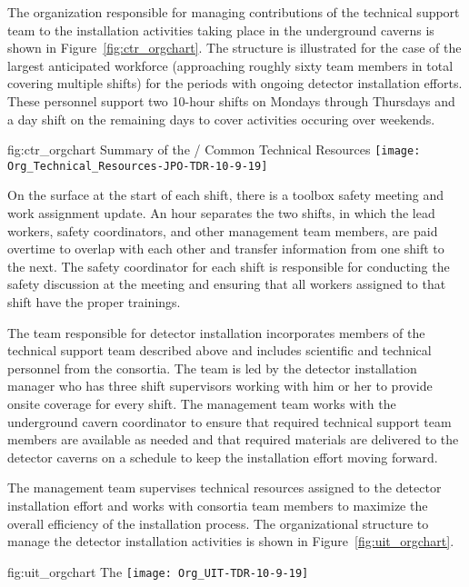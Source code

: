The organization responsible for managing contributions of 
the technical support team to the installation 
activities taking place in the underground caverns is shown 
in Figure~\ref{fig:ctr_orgchart}.  The structure is illustrated
for the case of the largest anticipated workforce (approaching 
roughly sixty team members in total covering multiple shifts) 
for the periods with ongoing detector installation efforts.
These personnel support two 10-hour shifts on Mondays through 
Thursdays and a day shift on the remaining days to cover 
activities occuring over weekends. 
\begin{dunefigure}{fig:ctr_orgchart}
  {Summary of the / Common Technical Resources}
  \texttt{[image: Org\_Technical\_Resources-JPO-TDR-10-9-19]}
\end{dunefigure}

On the surface at the start of each shift, there is a toolbox safety
meeting and work assignment update. An hour separates the two shifts,
in which the lead workers, safety coordinators, and other management
team members, are paid overtime to overlap with each other and
transfer information from one shift to the next. The safety
coordinator for each shift is responsible for conducting the safety
discussion at the meeting and ensuring that all workers assigned to
that shift have the proper trainings.

The team responsible for detector installation incorporates 
members of the technical support team described above 
and includes scientific and technical personnel from 
the  consortia.  The team is led by the detector
installation manager who has three shift supervisors working 
with him or her to provide onsite coverage for every shift.
The management team works with the underground cavern
coordinator to ensure that required technical support team 
members are available as needed and that required materials 
are delivered to the detector caverns on a schedule to keep
the installation effort moving forward.         

The management team supervises technical resources assigned to 
the detector installation effort and works with consortia 
team members to maximize the overall efficiency of the installation 
process.  The organizational structure to manage the detector 
installation activities is shown in Figure~\ref{fig:uit_orgchart}.
\begin{dunefigure}{fig:uit_orgchart}
  {The }
  \texttt{[image: Org\_UIT-TDR-10-9-19]}
\end{dunefigure}

